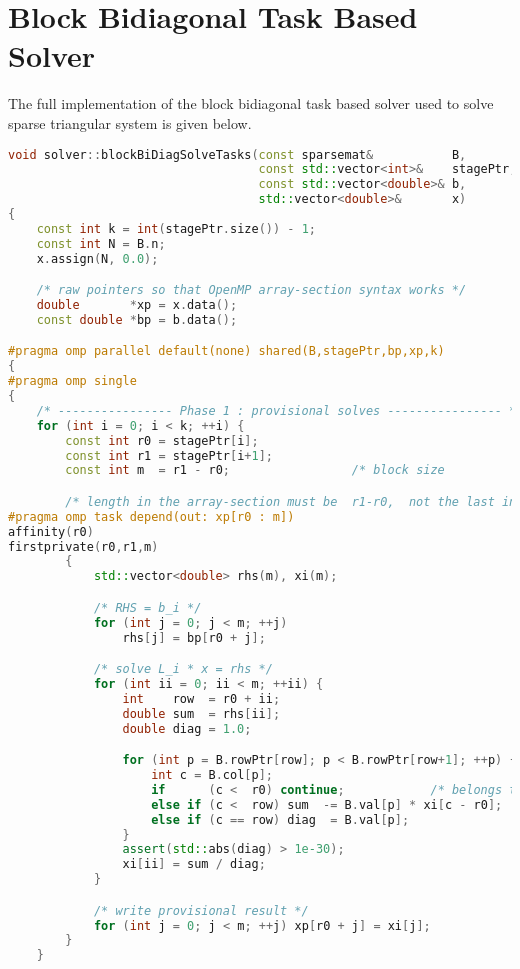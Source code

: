 \chapter{Block Bidiagonal Task Based Solver}
\label{app:code}
The full implementation of the block bidiagonal task based solver used to solve sparse triangular system is given below.
\begin{lstlisting}[language=C++,caption={Full implementation of the
\texttt{blockBiDiagSolveTasks} kernel.}]
void solver::blockBiDiagSolveTasks(const sparsemat&           B,
                                   const std::vector<int>&    stagePtr,
                                   const std::vector<double>& b,
                                   std::vector<double>&       x)
{
    const int k = int(stagePtr.size()) - 1;
    const int N = B.n;
    x.assign(N, 0.0);

    /* raw pointers so that OpenMP array-section syntax works */
    double       *xp = x.data();
    const double *bp = b.data();

#pragma omp parallel default(none) shared(B,stagePtr,bp,xp,k)
{
#pragma omp single
{
    /* ---------------- Phase 1 : provisional solves ---------------- */
    for (int i = 0; i < k; ++i) {
        const int r0 = stagePtr[i];
        const int r1 = stagePtr[i+1];
        const int m  = r1 - r0;                 /* block size            */

        /* length in the array-section must be  r1-r0,  not the last index */
#pragma omp task depend(out: xp[r0 : m]) 
affinity(r0)
firstprivate(r0,r1,m)
        {
            std::vector<double> rhs(m), xi(m);

            /* RHS = b_i */
            for (int j = 0; j < m; ++j)
                rhs[j] = bp[r0 + j];

            /* solve L_i * x = rhs */
            for (int ii = 0; ii < m; ++ii) {
                int    row  = r0 + ii;
                double sum  = rhs[ii];
                double diag = 1.0;

                for (int p = B.rowPtr[row]; p < B.rowPtr[row+1]; ++p) {
                    int c = B.col[p];
                    if      (c <  r0) continue;            /* belongs to B_i   */
                    else if (c <  row) sum  -= B.val[p] * xi[c - r0];
                    else if (c == row) diag  = B.val[p];
                }
                assert(std::abs(diag) > 1e-30);
                xi[ii] = sum / diag;
            }

            /* write provisional result */
            for (int j = 0; j < m; ++j) xp[r0 + j] = xi[j];
        }
    }


\end{lstlisting}
